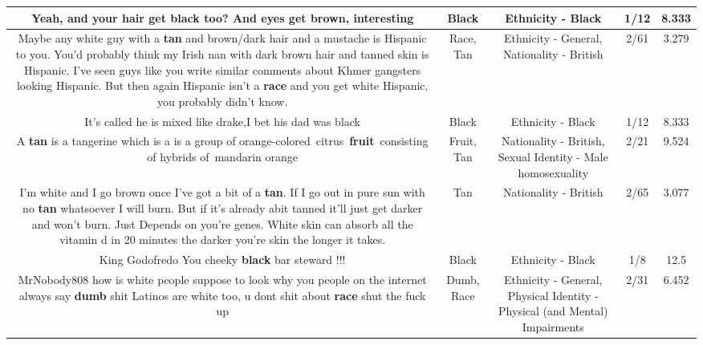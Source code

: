 \documentclass[11pt]{article}
\newlength\mylength
\begin{document}
\begin{center}
\begin{longtable}{|C{.65\mylength}|C{.30\mylength}|C{.12\mylength}|C{.12\mylength}|C{.12\mylength}|}
  \small Yeah, and your hair get \textbf{black} too?  And eyes get brown, interesting\normalsize   & Black & Ethnicity - Black & 1/12 & 8.333 \\  \hline
  \small Maybe any white guy with a \textbf{tan} and brown/dark hair and a mustache is Hispanic to you. You'd probably think my Irish nan with dark brown hair and tanned skin is Hispanic. I've seen guys like you write similar comments about Khmer gangsters looking Hispanic. But then again Hispanic isn't a \textbf{race} and you get white Hispanic, you probably didn't know.\normalsize   & Race, Tan & Ethnicity - General, Nationality - British & 2/61 & 3.279 \\  \hline
  \small It's called he is mixed like drake,I bet his dad was black\normalsize   & Black & Ethnicity - Black & 1/12 & 8.333 \\  \hline
  \small A \textbf{tan} is a tangerine which is a is a group of orange-colored citrus \textbf{fruit} consisting of hybrids of mandarin orange\normalsize   & Fruit, Tan & Nationality - British, Sexual Identity - Male homosexuality & 2/21 & 9.524 \\  \hline
  \small I'm white and I go brown once I've got a bit of a \textbf{tan}. If I go out in pure sun with no \textbf{tan} whatsoever I will burn. But if it's already abit tanned it'll just get darker and won't burn. Just  Depends on you're genes. White skin can absorb all the vitamin d in 20 minutes the darker you're skin the longer it takes.\normalsize   & Tan & Nationality - British & 2/65 & 3.077 \\  \hline
  \small King Godofredo You cheeky \textbf{black} bar steward !!!\normalsize   & Black & Ethnicity - Black & 1/8 & 12.5 \\  \hline
  \small MrNobody808 how is white people suppose to look why you people on the internet always say \textbf{dumb} shit Latinos are white too, u dont shit about \textbf{race} shut the fuck up\normalsize   & Dumb, Race & Ethnicity - General, Physical Identity - Physical (and Mental) Impairments & 2/31 & 6.452 \\  \hline

\end{longtable}
\end{center}
\end{document}
